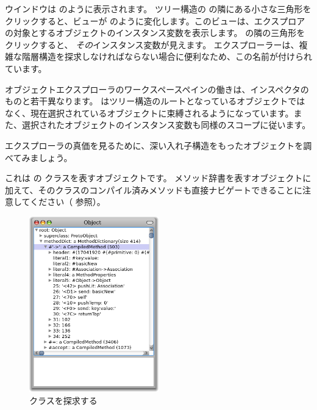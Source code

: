 \documentclass[a4paper,10pt,twoside]{book}
\begin{document}
ウインドウは  のように表示されます。
ツリー構造の  の隣にある小さな三角形をクリックすると、ビューが  のように変化します。このビューは、エクスプロアの対象とするオブジェクトのインスタンス変数を表示します。
 の隣の三角形をクリックすると、 \emph{その}インスタンス変数が見えます。
エクスプローラーは、複雑な階層構造を探求しなければならない場合に便利なため、この名前が付けられています。

オブジェクトエクスプローラのワークスペースペインの働きは、インスペクタのものと若干異なります。
 はツリー構造のルートとなっているオブジェクトではなく、現在選択されているオブジェクトに束縛されるようになっています。また、選択されたオブジェクトのインスタンス変数も同様のスコープに従います。

エクスプローラの真価を見るために、深い入れ子構造をもったオブジェクトを調べてみましょう。

これは \pharo の  クラスを表すオブジェクトです。
メソッド辞書を表すオブジェクトに加えて、そのクラスのコンパイル済みメソッドも直接ナビゲートできることに注意してください（  参照）。

\begin{figure}[tbp]
\begin{center}
\includegraphics[width=0.5\textwidth]{ExploreObject}
\end{center}
\caption{ クラスを探求する}
\end{figure}
\end{document}
